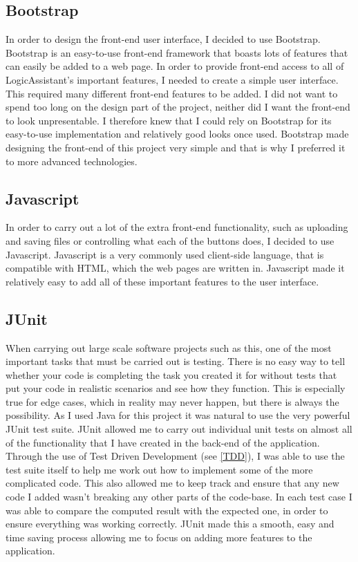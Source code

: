 \subsection{Bootstrap \label{bootstrap}}
In order to design the front-end user interface, I decided to use Bootstrap. Bootstrap is an easy-to-use front-end framework that boasts lots of features that can easily be added to a web page. In order to provide front-end access to all of LogicAssistant's important features, I needed to create a simple user interface. This required many different front-end features to be added. I did not want to spend too long on the design part of the project, neither did I want the front-end to look unpresentable. I therefore knew that I could rely on Bootstrap for its easy-to-use implementation and relatively good looks once used. Bootstrap made designing the front-end of this project very simple and that is why I preferred it to more advanced technologies.

\subsection{Javascript}

In order to carry out a lot of the extra front-end functionality, such as uploading and saving files or controlling what each of the buttons does, I decided to use Javascript. Javascript is a very commonly used client-side language, that is compatible with HTML, which the web pages are written in. Javascript made it relatively easy to add all of these important features to the user interface. 

\subsection{JUnit\label{JUnit}}

When carrying out large scale software projects such as this, one of the most important tasks that must be carried out is testing. There is no easy way to tell whether your code is completing the task you created it for without tests that put your code in realistic scenarios and see how they function. This is especially true for edge cases, which in reality may never happen, but there is always the possibility. As I used Java for this project it was natural to use the very powerful JUnit test suite. JUnit allowed me to carry out individual unit tests on almost all of the functionality that I have created in the back-end of the application. Through the use of Test Driven Development (see \ref{TDD}), I was able to use the test suite itself to help me work out how to implement some of the more complicated code. This also allowed me to keep track and ensure that any new code I added wasn't breaking any other parts of the code-base. In each test case I was able to compare the computed result with the expected one, in order to ensure everything was working correctly. JUnit made this a smooth, easy and time saving process allowing me to focus on adding more features to the application.

